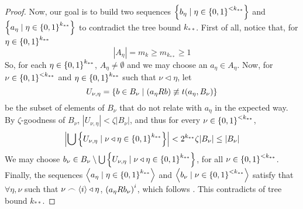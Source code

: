 \begin{lemma}[Claim 5.4.1]
\begin{proof}
            Now, our goal is to build two sequences $\left\{ b_\eta \mid \eta \in \left\{ 0,1 \right\}^{<k_{**}} \right\}$ and
            $\left\{ a_\eta \mid \eta \in \left\{ 0,1 \right\}^{k_{**}} \right\}$ to contradict the tree bound $k_{**}$.
            First of all, notice that, for $\eta \in \left\{ 0,1 \right\}^{k_{**}}$
            \[
                |A_\eta| = m_k \geq m_{k_{**}} \geq 1
            \]
            So, for each $\eta \in \left\{ 0,1 \right\}^{k_{**}}$, $A_\eta \neq \emptyset$ and we may choose an $a_\eta \in A_\eta$.
            Now, for $\nu \in \left\{ 0,1 \right\}^{<k_{**}}$ and $\eta \in \left\{ 0,1 \right\}^{k_{**}}$ such that $\nu \triangleleft \eta$, let
            \[
                U_{\nu,\eta} = \left\{ b \in B_\nu \mid (a_\eta R b) \not\equiv t(a_\eta, B_\nu) \right\}
            \]
            be the subset of elements of $B_\nu$ that do not relate with $a_\eta$ in the expected way.
            By $\zeta$-goodness of $B_\nu$, $|U_{\nu, \eta}| < \zeta |B_\nu|$, and thus for every $\nu \in \left\{ 0,1 \right\}^{<k_{**}}$,
            \[
                \left| \bigcup\left\{  U_{\nu,\eta} \mid \nu \triangleleft \eta \in \left\{ 0,1 \right\}^{k_{**}} \right\} \right| <
                2^{k_{**}} \zeta |B_\nu| \leq |B_\nu|
            \]
            We may choose $b_\nu \in B_\nu \setminus \bigcup\left\{ U_{\nu,\eta} \mid \nu \triangleleft \eta \in \left\{ 0,1 \right\}^{k_{**}} \right\}$,
            for all $\nu \in \left\{ 0,1 \right\}^{<k_{**}}$.
            Finally, the sequences $\left< a_\eta \mid \eta \in \left\{ 0,1 \right\}^{k_{**}} \right>$ and
            $\left< b_\nu \mid \nu \in \left\{ 0,1 \right\}^{<k_{**}} \right>$ satisfy that $\forall \eta, \nu$ such that
            $\nu \frown \left< i \right> \triangleleft \eta$, $\left( a_\eta R b_\nu \right)^i$, which follows
            .
            This contradicts  of tree bound $k_{**}$.
        \end{proof}
    \end{lemma}

